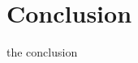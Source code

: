 \documentclass[../main.tex]{subfiles}
\begin{document}
\section{Conclusion}

the conclusion
\end{document}
